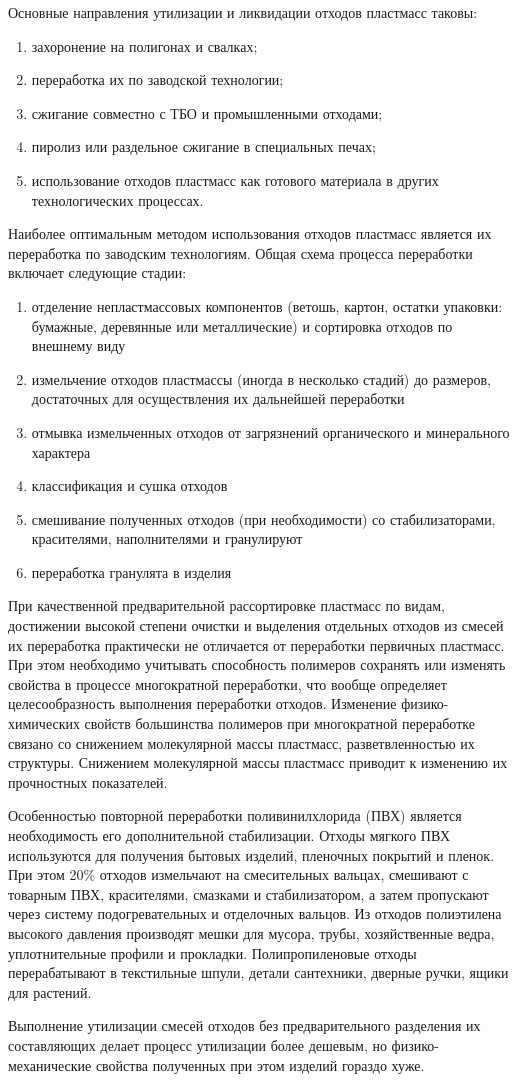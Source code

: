 Основные направления утилизации и ликвидации отходов пластмасс таковы:
\begin{enumerate}
\item захоронение на полигонах и свалках;
\item переработка их по заводской технологии;
\item сжигание совместно с ТБО и промышленными отходами;
\item пиролиз или раздельное сжигание в специальных печах;
\item использование отходов пластмасс как готового материала в других технологических процессах.
\end{enumerate}

Наиболее оптимальным методом использования отходов пластмасс является их
переработка по заводским технологиям. Общая схема процесса переработки
включает следующие стадии:
\begin{enumerate}[1.]
\item отделение непластмассовых компонентов (ветошь, картон, остатки упаковки:
	бумажные, деревянные или металлические) и сортировка отходов по внешнему виду
\item измельчение отходов пластмассы (иногда в несколько стадий) до размеров,
	достаточных для осуществления их дальнейшей переработки
\item отмывка измельченных отходов от загрязнений органического и минерального
	характера
\item классификация и сушка отходов
\item смешивание полученных отходов (при необходимости) со стабилизаторами,
	красителями, наполнителями и гранулируют
\item переработка гранулята в изделия
\end{enumerate}

При качественной предварительной рассортировке пластмасс по видам, достижении высокой
степени очистки и выделения отдельных отходов из смесей их переработка практически не
отличается от переработки первичных пластмасс. При этом необходимо учитывать способность
полимеров сохранять или изменять свойства в процессе многократной переработки, что
вообще определяет целесообразность выполнения переработки отходов. Изменение физико-химических
свойств большинства полимеров при многократной переработке связано со снижением молекулярной
массы пластмасс, разветвленностью их структуры. Снижением молекулярной массы пластмасс
приводит к изменению их прочностных показателей.

Особенностью повторной переработки поливинилхлорида (ПВХ) является необходимость
его дополнительной стабилизации. Отходы мягкого ПВХ используются для получения
бытовых изделий, пленочных покрытий и пленок. При этом 20\% отходов измельчают
на смесительных вальцах, смешивают с товарным ПВХ, красителями, смазками и
стабилизатором, а затем пропускают через систему подогревательных и отделочных
вальцов. Из отходов полиэтилена высокого давления производят мешки для мусора,
трубы, хозяйственные ведра, уплотнительные профили и прокладки. Полипропиленовые
отходы перерабатывают в текстильные шпули, детали сантехники, дверные ручки, ящики для растений.

Выполнение утилизации смесей отходов без предварительного разделения их
составляющих делает процесс утилизации более дешевым, но физико-механические
свойства полученных при этом изделий гораздо хуже.
